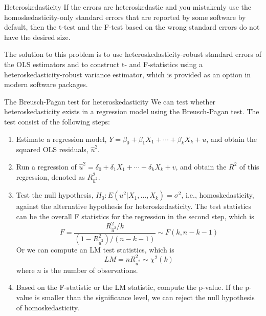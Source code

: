\documentclass[presentation,10pt]{beamer}
\begin{document}
\begin{frame}[label={sec:orgaeb8fe8}]{Heteroskedasticity}
If the errors are heteroskedastic and you mistakenly use the
homoskedasticity-only standard errors that are reported by some
software by default, then the t-test and the F-test based on the wrong
standard errors do not have the desired size. 

\vspace{0.3cm}
The solution to this problem is to use heteroskedasticity-robust
standard errors of the OLS estimators and to construct t- and
F-statistics using a heteroskedasticity-robust variance estimator,
which is provided as an option in modern software packages. 
\end{frame}

\begin{frame}[shrink,label={sec:org05e6dfe}]{The Breusch-Pagan test for heteroskedasticity}
We can test whether heteroskedasticity exists in a regression model
using the Breusch-Pagan test. The test consist of the following steps: 
\begin{enumerate}
\item Estimate a regression model, \(Y = \beta_0 + \beta_1 X_1 + \cdots +
   \beta_k X_k + u\), and obtain the squared OLS residuals,
\(\hat{u}^2\).
\item Run a regression of \(\hat{u}^2 = \delta_0 + \delta_1 X_1 + \cdots +
   \delta_k X_k + v\), and obtain the \(R^2\) of this regression, denoted
as \(R^2_{\hat{u}^2}\).
\item Test the null hypothesis, \(H_0: E(u^2 | X_1, \ldots, X_k) =
   \sigma^2\), i.e., homoskedasticity, against the alternative
hypothesis for heteroskedasticity. The test statistics can be the
overall F statistics for the regression in the second step, which
is
\[ F = \frac{R^2_{\hat{u}^2}/k}{(1 - R^2_{\hat{u}^2})/(n-k-1)} \sim
   F(k, n-k-1)\]
Or we can compute an LM test statistics, which is
\[ LM = n R^2_{\hat{u}^2} \sim \chi^2(k) \]
where \(n\) is the number of observations.
\item Based on the F-statistic or the LM statistic, compute the
p-value. If the p-value is smaller than the significance level, we
can reject the null hypothesis of homoskedasticity.
\end{enumerate}
\end{frame}
\end{document}
